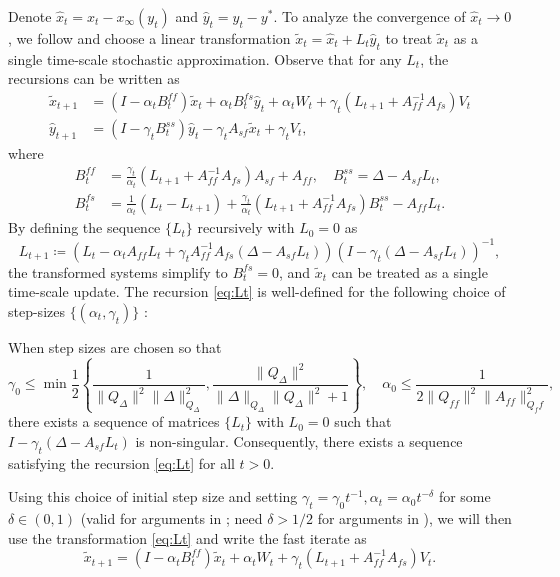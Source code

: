 Denote $\hat{x}_t = x_t - x_\infty (y_t)$ and $\hat{y}_t = y_t - y^*$.
To analyze the convergence of $\hat{x}_t \to 0$, we follow \citep{konda2004convergence,kaledin2020finite} and choose a linear transformation $\tilde{x}_t = \hat{x}_t + L_t \hat{y}_t$ to treat $\tilde{x}_t$ as a single time-scale stochastic approximation.
Observe that for any $L_t$, the recursions can be written as
\begin{align*}
    \tilde{x}_{t+1} &= (I - \alpha_t B^{ff}_t) \tilde{x}_t + \alpha_t B^{fs}_t \hat{y}_t + \alpha_t W_t + \gamma_t (L_{t+1} + A_{ff}^{-1} A_{fs}) V_t \\ 
    \hat{y}_{t+1} &= (I - \gamma_t B^{ss}_t) \hat{y}_t -\gamma_t A_{sf} \tilde{x}_t + \gamma_t V_t ,
\end{align*}
where
\begin{align}
    B^{ff}_t &= \frac{\gamma_t}{\alpha_t}(L_{t+1} + A_{ff}^{-1} A_{fs}) A_{sf} + A_{ff} , \quad 
    B^{ss}_t = \Delta - A_{sf} L_t , \\
    B^{fs}_t &= \frac{1}{\alpha_t}(L_t - L_{t+1}) + \frac{\gamma_t}{\alpha_t}(L_{t+1} + A_{ff}^{-1} A_{fs}) B^{ss}_t - A_{ff} L_t .
\end{align}
By defining the sequence $\{L_t\}$ recursively with $L_0 = 0$ as
\begin{equation}
    L_{t+1} \coloneqq \left(L_t - \alpha_t A_{ff} L_t + \gamma_t A_{ff}^{-1} A_{fs}(\Delta - A_{sf} L_t)\right) (I - \gamma_t (\Delta - A_{sf} L_t))^{-1}  ,
\end{equation}
the transformed systems simplify to $B^{fs}_t = 0$, and $\tilde{x}_t$ can be treated as a single time-scale update.
The recursion \eqref{eq:Lt} is well-defined for the following choice of step-sizes $\{(\alpha_t, \gamma_t)\}$ :
\begin{proposition}
    When step sizes are chosen so that
    \begin{equation}\label{eq:stepsize}
        \gamma_0 \leq \min \frac{1}{2} \left\{ \frac{1}{\lVert Q_\Delta \rVert^2 \lVert \Delta\rVert^2_{Q_\Delta}}, \frac{\lVert Q_\Delta\rVert^2}{\lVert \Delta \rVert_{Q_\Delta} \lVert Q_\Delta\rVert^2 + 1} \right\}
        , \quad 
        \alpha_0 \leq \frac{1}{2 \lVert Q_{ff}\rVert^2 \lVert A_{ff}\rVert_{Q_ff}^2} ,
    \end{equation}    
    there exists a sequence of matrices $\{L_t\}$ with $L_0 = 0$ such that $I - \gamma_t (\Delta - A_{sf}L_t)$ is non-singular. 
    Consequently, there exists a sequence satisfying the recursion \eqref{eq:Lt} for all $t >0$.
\end{proposition}
Using this choice of initial step size and setting $\gamma_t = \gamma_0 t^{-1}, \alpha_t = \alpha_0 t^{-\delta}$ for some $\delta \in (0, 1)$ (valid for arguments in \citet{polyakJuditsky}; need $\delta > 1/2$ for arguments in \citet{konda2004convergence}), we will then use the transformation \eqref{eq:Lt} and write the fast iterate as
\begin{equation}
    \tilde{x}_{t+1} = (I - \alpha_t B^{ff}_t) \tilde{x}_t + \alpha_t W_t + \gamma_t (L_{t+1} + A_{ff}^{-1} A_{fs})V_t .
\end{equation}



